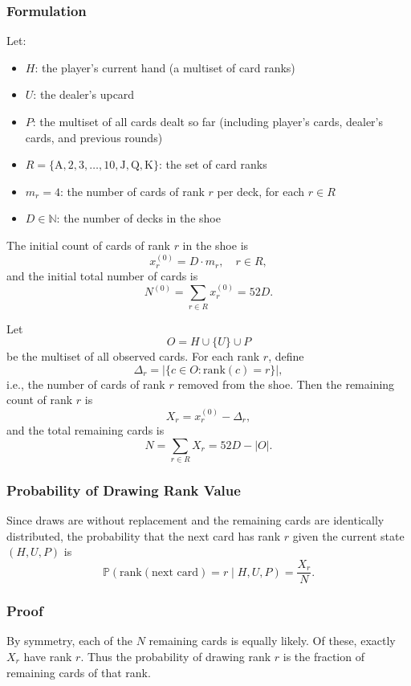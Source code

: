 \documentclass[12pt,a4paper]{cibb}
\begin{document}
\subsubsection{Formulation}

Let:
\begin{itemize}
  \item $H$: the player's current hand (a multiset of card ranks)
  \item $U$: the dealer's upcard
  \item $P$: the multiset of all cards dealt so far (including player's cards, dealer's cards, and previous rounds)
  \item $R = \{\mathrm{A}, 2, 3, \dots, 10, \mathrm{J}, \mathrm{Q}, \mathrm{K}\}$: the set of card ranks
  \item $m_r = 4$: the number of cards of rank $r$ per deck, for each $r \in R$
  \item $D \in \mathbb{N}$: the number of decks in the shoe
\end{itemize}

The initial count of cards of rank $r$ in the shoe is
\[
  x_r^{(0)} = D \cdot m_r, \quad r\in R,
\]
and the initial total number of cards is
\[
  N^{(0)} = \sum_{r\in R} x_r^{(0)} = 52D.
\]

Let
\[
  O = H \cup \{U\} \cup P
\]
be the multiset of all observed cards.
For each rank $r$, define
\[
  \Delta_r = |\{c \in O : \mathrm{rank}(c)=r\}|,
\]
i.e., the number of cards of rank $r$ removed from the shoe.
Then the remaining count of rank $r$ is
\[
  X_r = x_r^{(0)} - \Delta_r,
\]
and the total remaining cards is
\[
  N = \sum_{r\in R} X_r = 52D - |O|.
\]
\subsubsection{Probability of Drawing Rank Value}

Since draws are without replacement and the remaining cards are identically distributed, the probability that the next card has rank $r$ given the current state $(H,U,P)$ is
\[
  \mathbb{P}(\mathrm{rank}(\text{next card}) = r \mid H, U, P)
  = \frac{X_r}{N}.
\]

\subsubsection{Proof}

By symmetry, each of the $N$ remaining cards is equally likely. Of these, exactly $X_r$ have rank $r$. 
Thus the probability of drawing rank $r$ is the fraction of remaining cards of that rank. 
\end{document}
